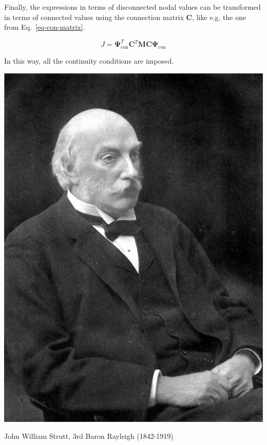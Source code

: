 Finally, the expressions in terms of disconnected nodal values can be transformed in terms of connected values using the connection matrix ${\mathbf C}$, like e.g. the one from Eq.~\ref{eq-con-matrix}. 

\begin{equation}
J = {\mathbf \Psi}^{T}_\mathrm{con}  {\mathbf C}^T {\mathbf M} {\mathbf C}  {\mathbf \Psi}_\mathrm{con}
\end{equation} 

In this way, all the continuity conditions are imposed.

\pagebreak


\begin{marginfigure}[0.5cm]
  \includegraphics{numeric/figures/Rayleigh}
  \caption{John William Strutt, 3rd Baron Rayleigh (1842-1919)}
\end{marginfigure}

